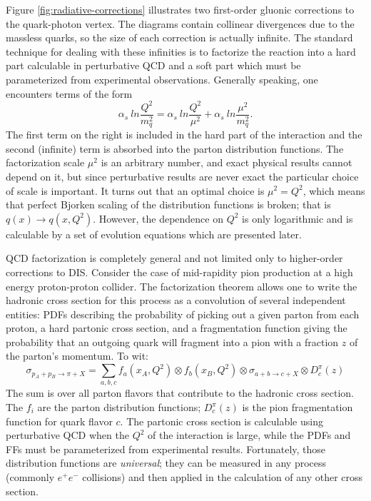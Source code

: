 Figure \ref{fig:radiative-corrections} illustrates two first-order gluonic
corrections to the quark-photon vertex. The diagrams contain collinear
divergences due to the massless quarks, so the size of each correction is
actually infinite. The standard technique for dealing with these infinities is
to factorize the reaction into a hard part calculable in perturbative QCD and a
soft part which must be parameterized from experimental observations. Generally
speaking, one encounters terms of the form
%
\begin{equation}
  \alpha_s~ln \frac{Q^2}{m_q^2} = \alpha_s~ln \frac{Q^2}{\mu^2} + \alpha_s~ln \frac{\mu^2}{m_q^2}.
\end{equation}
%
The first term on the right is included in the hard part of the interaction and
the second (infinite) term is absorbed into the parton distribution functions.
The factorization scale \(\mu^2\) is an arbitrary number, and exact physical
results cannot depend on it, but since perturbative results are never exact the
particular choice of scale is important. It turns out that an optimal choice is
\(\mu^2 = Q^2\), which means that perfect Bjorken scaling of the distribution
functions is broken; that is \(q(x) \rightarrow q(x,Q^2)\). However, the
dependence on \(Q^2\) is only logarithmic and is calculable by a set of
evolution equations which are presented later.

QCD factorization is completely general and not limited only to higher-order
corrections to DIS. Consider the case of mid-rapidity pion production at a high
energy proton-proton collider. The factorization theorem allows one to write the
hadronic cross section for this process as a convolution of several independent
entities: PDFs describing the probability of picking out a given parton from
each proton, a hard partonic cross section, and a fragmentation function giving
the probability that an outgoing quark will fragment into a pion with a fraction
\(z\) of the parton's momentum. To wit:
%
\begin{equation}
  \sigma_{p_A+p_B \rightarrow \pi+X} = \sum_{a,b,c} f_a(x_A, Q^2) \otimes f_b(x_B, Q^2) \otimes \sigma_{a+b \rightarrow c + X} \otimes D_c^{\pi}(z)
  \label{eqn:factorization}
\end{equation}
%
The sum is over all parton flavors that contribute to the hadronic cross
section. The \(f_i\) are the parton distribution functions; \(D_c^{\pi}(z)\) is
the pion fragmentation function for quark flavor \(c\). The partonic cross
section is calculable using perturbative QCD when the \(Q^2\) of the interaction
is large, while the PDFs and FFs must be parameterized from experimental
results. Fortunately, those distribution functions are \textit{universal}; they
can be measured in any process (commonly \(e^+e^-\) collisions) and then applied
in the calculation of any other cross section. %

